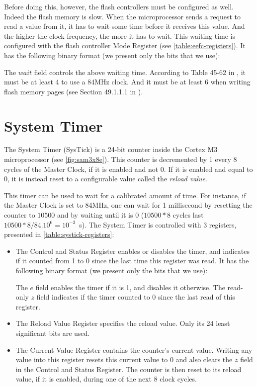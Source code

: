 Before doing this, however, the flash controllers must be configured as well.
Indeed the flash memory is slow. When the microprocessor sends a request to
read a value from it, it has to wait some time before it receives this value.
And the higher the clock frequency, the more it has to wait. This waiting time
is configured with the flash controller Mode Register (see
\cref{table:eefc-registers}). It has the following binary format (we present
only the bits that we use):

\begin{flushright}
\end{flushright}

\noindent The $wait$ field controls the above waiting time. According to Table
45-62 in \cite{SAM3X8E}, it must be at least 4 to use a 84MHz clock. And it
must be at least 6 when writing flash memory pages (see Section 49.1.1.1 in
\cite{SAM3X8E}).

\section{System Timer}\label{section:systick}

The System Timer (SysTick) is a 24-bit counter inside the Cortex M3
microprocessor (see \cref{fig:sam3x8e}). This counter is decremented by 1 every
8 cycles of the Master Clock, if it is enabled and not 0. If it is enabled and
equal to 0, it is instead reset to a configurable value called the {\em reload
value}.

This timer can be used to wait for a calibrated amount of time. For instance,
if the Master Clock is set to 84MHz, one can wait for 1 millisecond by
resetting the counter to $10500$ and by waiting until it is 0 ($10500*8$
cycles last $10500*8/84.10^6=10^{-3}$~s). The System Timer is
controlled with 3 registers, presented in \cref{table:systick-registers}:

\begin{itemize}
  \item The Control and Status Register enables or disables the timer, and
  indicates if it counted from 1 to 0 since the last time this register was
  read. It has the following binary format (we present only the bits that we
  use):


  The $e$ field enables the timer if it is 1, and disables it otherwise. The
  read-only $z$ field indicates if the timer counted to 0 since the last read
  of this register.

  \item The Reload Value Register specifies the reload value. Only its 24 least
  significant bits are used.

  \item The Current Value Register contains the counter's current value.
  Writing any value into this register resets this current value to 0 and also
  clears the $z$ field in the Control and Status Register. The counter is then
  reset to its reload value, if it is enabled, during one of the next 8 clock
  cycles.
\end{itemize}

